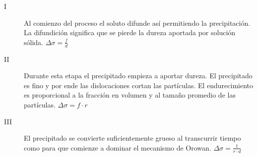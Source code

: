 \begin{description}
	\item[I] Al comienzo del proceso el soluto difunde así permitiendo la precipitación. La difundición significa que se pierde la dureza aportada por solución sólida. $\Delta \sigma = \frac{f}{d}$
	\item[II]  Durante esta etapa el precipitado empieza a aportar dureza. El precipitado es fino y por ende las dislocaciones cortan las partículas. El endurecimiento es proporcional a la fracción en volumen y al tamaño promedio de las partículas. $\Delta \sigma = f \cdot r$
	\item[III] El precipitado se convierte suficientemente grueso al transcurrir tiempo como para que comienze a dominar el mecanismo de Orowan. $\Delta \sigma = \frac{1}{r\cdot d}$
\end{description}




